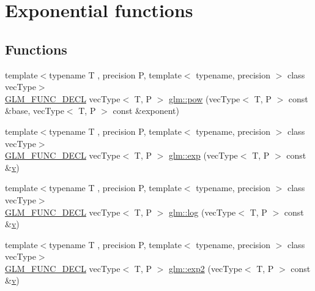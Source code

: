 \hypertarget{group__core__func__exponential}{}\section{Exponential functions}
\label{group__core__func__exponential}
\subsection*{Functions}
\begin{DoxyCompactItemize}
\item 
{\footnotesize template$<$typename T , precision P, template$<$ typename, precision $>$ class vec\+Type$>$ }\\\mbox{\hyperlink{setup_8hpp_ab2d052de21a70539923e9bcbf6e83a51}{G\+L\+M\+\_\+\+F\+U\+N\+C\+\_\+\+D\+E\+CL}} vec\+Type$<$ T, P $>$ \mbox{\hyperlink{group__core__func__exponential_ga082b332a4b7c6ad1d43e09ff19e214dd}{glm\+::pow}} (vec\+Type$<$ T, P $>$ const \&base, vec\+Type$<$ T, P $>$ const \&exponent)
\item 
{\footnotesize template$<$typename T , precision P, template$<$ typename, precision $>$ class vec\+Type$>$ }\\\mbox{\hyperlink{setup_8hpp_ab2d052de21a70539923e9bcbf6e83a51}{G\+L\+M\+\_\+\+F\+U\+N\+C\+\_\+\+D\+E\+CL}} vec\+Type$<$ T, P $>$ \mbox{\hyperlink{group__core__func__exponential_ga25e54a7f44fc49ec6ac6ffc7675cf04a}{glm\+::exp}} (vec\+Type$<$ T, P $>$ const \&\mbox{\hyperlink{glad_8h_a14cfbe2fc2234f5504618905b69d1e06}{v}})
\item 
{\footnotesize template$<$typename T , precision P, template$<$ typename, precision $>$ class vec\+Type$>$ }\\\mbox{\hyperlink{setup_8hpp_ab2d052de21a70539923e9bcbf6e83a51}{G\+L\+M\+\_\+\+F\+U\+N\+C\+\_\+\+D\+E\+CL}} vec\+Type$<$ T, P $>$ \mbox{\hyperlink{group__core__func__exponential_ga21efca311e62d233de0ae96bab126b83}{glm\+::log}} (vec\+Type$<$ T, P $>$ const \&\mbox{\hyperlink{glad_8h_a14cfbe2fc2234f5504618905b69d1e06}{v}})
\item 
{\footnotesize template$<$typename T , precision P, template$<$ typename, precision $>$ class vec\+Type$>$ }\\\mbox{\hyperlink{setup_8hpp_ab2d052de21a70539923e9bcbf6e83a51}{G\+L\+M\+\_\+\+F\+U\+N\+C\+\_\+\+D\+E\+CL}} vec\+Type$<$ T, P $>$ \mbox{\hyperlink{group__core__func__exponential_ga42ca440d9062f1f456f5a9e896378f9c}{glm\+::exp2}} (vec\+Type$<$ T, P $>$ const \&\mbox{\hyperlink{glad_8h_a14cfbe2fc2234f5504618905b69d1e06}{v}})

\end{DoxyCompactItemize}
